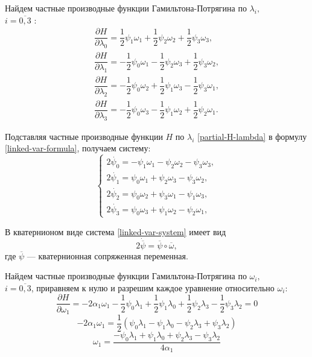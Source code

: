 \documentclass[14pt]{extreport}
\begin{document}
Найдем частные производные функции Гамильтона-Потрягина по $\lambda_i,$\\
$i=\overline{0,3}$ \cite{pontryagin2}:
\begin{equation}
\label{partial-H-lambda}
\begin{split}
\dfrac{\partial H}{\partial \lambda_0}=\dfrac{1}{2}\psi_1 \omega_1+\dfrac{1}{2}\psi_2 \omega_2 + \dfrac{1}{2} \psi_3 \omega_3,\\
\dfrac{\partial H}{\partial \lambda_1}=-\dfrac{1}{2}\psi_0 \omega_1-\dfrac{1}{2}\psi_2 \omega_3 + \dfrac{1}{2} \psi_3 \omega_2,\\
\dfrac{\partial H}{\partial \lambda_2}=-\dfrac{1}{2}\psi_0 \omega_2+\dfrac{1}{2}\psi_1 \omega_3 - \dfrac{1}{2} \psi_3 \omega_1,\\
\dfrac{\partial H}{\partial \lambda_3}=-\dfrac{1}{2}\psi_0 \omega_3-\dfrac{1}{2}\psi_1 \omega_2 + \dfrac{1}{2} \psi_2 \omega_1.
\end{split}
\end{equation}

Подставляя частные производные функции $H$ по $\lambda_i$ \eqref{partial-H-lambda} в формулу \eqref{linked-var-formula}, получаем систему:
\begin{equation}
\label{linked-var-system}
\begin{cases}
	2\dot{\psi_{0}} = -\psi_{1}\omega_{1} - \psi_{2}\omega_{2} - \psi_{3}\omega_{3},\\
	2\dot{\psi_{1}} = \psi_{0}\omega_{1} + \psi_{2}\omega_{3} - \psi_{3}\omega_{2},\\
	2\dot{\psi_{2}} = \psi_{0}\omega_{2} + \psi_{3}\omega_{1} - \psi_{1}\omega_{3},\\
	2\dot{\psi_{3}} = \psi_{0}\omega_{3} + \psi_{1}\omega_{2} - \psi_{2}\omega_{1},
\end{cases}
\end{equation}

В кватернионом виде система \eqref{linked-var-system} имеет вид
\begin{equation}
\label{linked-var-quaternion}
2\dot{\overline{\psi}} = \overline{\psi} \circ \overline{\omega},
\end{equation}
где $\overline{\psi}$ — кватернионная сопряженная переменная. 

Найдем частные производные функции Гамильтона-Потрягина по $\omega_i,$\\
$i=\overline{0,3}$, приравняем к нулю и разрешим каждое уравнение относительно $\omega_i$:
$$\dfrac{\partial H}{\partial \omega_1}=-2\alpha_1\omega_1-\dfrac{1}{2}\psi_0\lambda_1+\dfrac{1}{2}\psi_1\lambda_0+\dfrac{1}{2}\psi_2\lambda_3-\dfrac{1}{2}\psi_3\lambda_2=0$$
$$-2\alpha_1\omega_1=\dfrac{1}{2}(\psi_0\lambda_1-\psi_1\lambda_0-\psi_2\lambda_3+\psi_3\lambda_2)$$
$$\omega_1=\dfrac{-\psi_0\lambda_1+\psi_1\lambda_0+\psi_2\lambda_3-\psi_3\lambda_2}{4\alpha_1}$$
\end{document}
